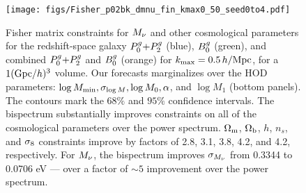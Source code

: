 \begin{figure}
    \begin{center}
        \texttt{[image: figs/Fisher\_p02bk\_dmnu\_fin\_kmax0\_50\_seed0to4.pdf]}
        \caption{Fisher matrix constraints for $M_\nu$ and other cosmological
        parameters for the redshift-space galaxy $P^g_0{+}P^g_2$ (blue), $B^g_0$
        (green), and combined $P^g_0{+}P^g_2$ and $B^g_0$ (orange) for $k_{\rm max} =
        0.5\,h/\mathrm{Mpc}$, for a $1 ({\rm Gpc}/h)^3$ volume. Our forecasts marginalizes over the \cite{zheng2007}
        HOD parameters: $\log M_{\rm min}, \sigma_{\log M}, \log M_0, \alpha$, 
        and $\log M_1$ (bottom panels). The contours mark the $68\%$ and $95\%$
        confidence intervals. The bispectrum substantially improves
        constraints on all of the cosmological parameters over the power
        spectrum. $\Omega_{\rm m}$, $\Omega_{\rm b}$, $h$, $n_s$, and $\sigma_8$ constraints improve by factors
        of 2.8, 3.1, 3.8, 4.2, and 4.2, respectively. For $M_\nu$, the
        bispectrum improves $\sigma_{M_\nu}$ from 0.3344 to 0.0706 eV --- over
        a factor of ${\sim}5$ improvement over the power spectrum.
        }
        \label{fig:forecast}
    \end{center}
\end{figure}

